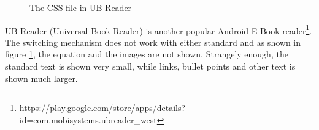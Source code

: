 \begin{figure}[H]
	\centering
	\caption{The CSS file in UB Reader}
	\label{fig:ubreader}
\end{figure}
UB Reader (Universal Book Reader) is another popular Android E-Book reader\footnote{https://play.google.com/store/apps/details?id=com.mobisystems.ubreader\_west}. The switching mechanism does not work with either standard and as shown in figure \ref{fig:ubreader}, the equation and the images are not shown. Strangely enough, the standard text is shown very small, while links, bullet points and other text is shown much larger.


